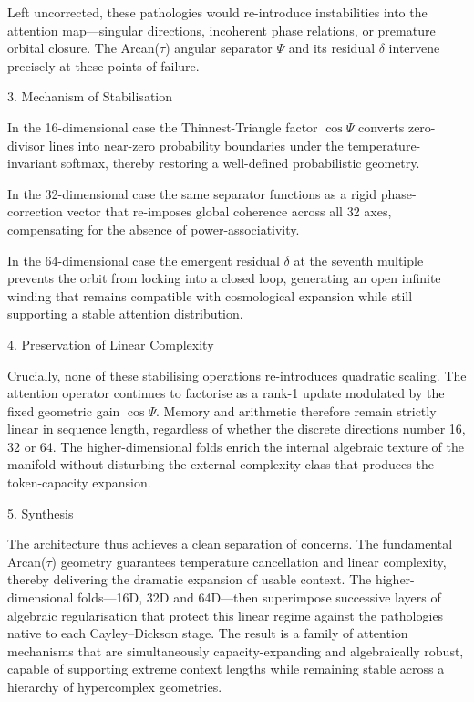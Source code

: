 Left uncorrected, these pathologies would re-introduce instabilities into the attention map—singular directions, incoherent phase relations, or premature orbital closure. The Arcan(\(\tau\)) angular separator \(\Psi\) and its residual \(\delta\) intervene precisely at these points of failure.

3. Mechanism of Stabilisation

In the 16-dimensional case the Thinnest-Triangle factor \(\cos\Psi\) converts zero-divisor lines into near-zero probability boundaries under the temperature-invariant softmax, thereby restoring a well-defined probabilistic geometry.  

In the 32-dimensional case the same separator functions as a rigid phase-correction vector that re-imposes global coherence across all 32 axes, compensating for the absence of power-associativity.  

In the 64-dimensional case the emergent residual \(\delta\) at the seventh multiple prevents the orbit from locking into a closed loop, generating an open infinite winding that remains compatible with cosmological expansion while still supporting a stable attention distribution.

4. Preservation of Linear Complexity

Crucially, none of these stabilising operations re-introduces quadratic scaling. The attention operator continues to factorise as a rank-1 update modulated by the fixed geometric gain \(\cos\Psi\). Memory and arithmetic therefore remain strictly linear in sequence length, regardless of whether the discrete directions number 16, 32 or 64. The higher-dimensional folds enrich the internal algebraic texture of the manifold without disturbing the external complexity class that produces the token-capacity expansion.

5. Synthesis

The architecture thus achieves a clean separation of concerns. The fundamental Arcan(\(\tau\)) geometry guarantees temperature cancellation and linear complexity, thereby delivering the dramatic expansion of usable context. The higher-dimensional folds—16D, 32D and 64D—then superimpose successive layers of algebraic regularisation that protect this linear regime against the pathologies native to each Cayley–Dickson stage. The result is a family of attention mechanisms that are simultaneously capacity-expanding and algebraically robust, capable of supporting extreme context lengths while remaining stable across a hierarchy of hypercomplex geometries.
 
